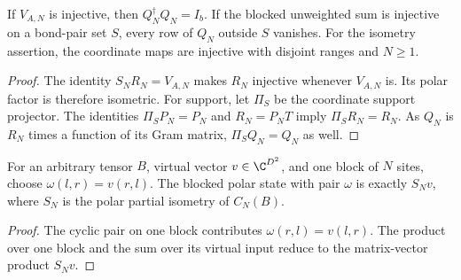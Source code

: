 \begin{lemma}
    \label{thm:ldp_exact_virtual_encoder}
    \leanok
    If $V_{A,N}$ is injective, then $Q_N^\dagger Q_N=I_b$.
    If the blocked unweighted sum is injective on a bond-pair set $S$,
    every row of $Q_N$ outside $S$ vanishes. For the isometry assertion,
    the coordinate maps are injective with disjoint ranges and $N\ge1$.
\end{lemma}
\begin{proof}\leanok
    The identity $S_NR_N=V_{A,N}$ makes $R_N$ injective whenever
    $V_{A,N}$ is. Its polar factor is therefore isometric.
    For support, let $\Pi_S$ be the coordinate support projector.
    The identities $\Pi_SP_N=P_N$ and $R_N=P_NT$ imply
    $\Pi_SR_N=R_N$. As $Q_N$ is $R_N$ times a function of its Gram matrix,
    $\Pi_SQ_N=Q_N$ as well.
\end{proof}

\begin{lemma}
    \label{thm:ldp_one_block_encoder_orientation}
    \leanok
    For an arbitrary tensor $B$, virtual vector $v\in\C^{D^2}$, and
    one block of $N$ sites, choose $\omega(l,r)=v(r,l)$.
    The blocked polar state with pair $\omega$ is exactly $S_Nv$,
    where $S_N$ is the polar partial isometry of $C_N(B)$.
\end{lemma}
\begin{proof}\leanok
    The cyclic pair on one block contributes $\omega(r,l)=v(l,r)$.
    The product over one block and the sum over its virtual input reduce
    to the matrix-vector product $S_Nv$.
\end{proof}

